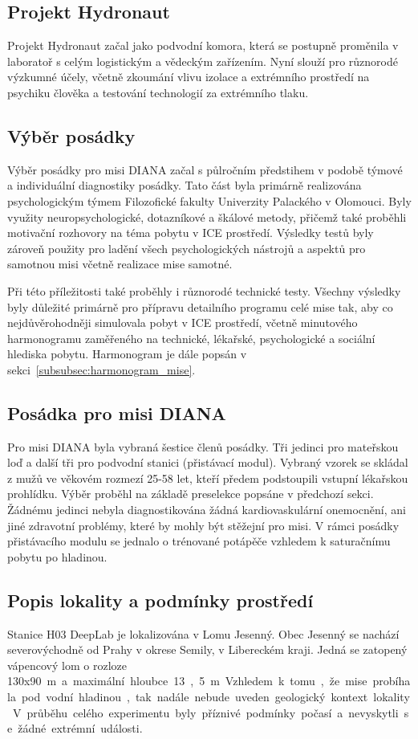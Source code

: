 \subsection{Projekt Hydronaut}
\label{subsec:projekt_hydronaut}
Projekt Hydronaut začal jako podvodní komora, která se postupně proměnila v
laboratoř s celým logistickým a vědeckým zařízením. Nyní slouží pro různorodé
výzkumné účely, včetně zkoumání vlivu izolace a extrémního prostředí na psychiku
člověka a testování technologií za extrémního tlaku.

\subsection{Výběr posádky}
\label{subsec:vyber_posadky}
Výběr posádky pro misi DIANA začal s půlročním předstihem v podobě týmové a
individuální diagnostiky posádky. Tato část byla primárně realizována
psychologickým týmem Filozofické fakulty Univerzity Palackého v Olomouci. Byly
využity neuropsychologické, dotazníkové a škálové metody, přičemž také proběhli
motivační rozhovory na téma pobytu v ICE prostředí. Výsledky testů byly zároveň
použity pro ladění všech psychologických nástrojů a aspektů pro samotnou misi
včetně realizace mise samotné.

Při této příležitosti také proběhly i různorodé technické testy. Všechny
výsledky byly důležité primárně pro přípravu detailního programu celé mise tak,
aby co nejdůvěrohodněji simulovala pobyt v ICE prostředí, včetně minutového
harmonogramu zaměřeného na technické, lékařské, psychologické a sociální
hlediska pobytu. Harmonogram je dále popsán v sekci~\ref{subsubsec:harmonogram_mise}.

\subsection{Posádka pro misi DIANA}
Pro misi DIANA byla vybraná šestice členů posádky. Tři jedinci pro mateřskou loď
a další tři pro podvodní stanici (přistávací modul). Vybraný vzorek se skládal z
mužů ve věkovém rozmezí 25-58 let, kteří předem podstoupili vstupní lékařskou
prohlídku. Výběr proběhl na základě preselekce popsáne v předchozí sekci.
Žádnému jedinci nebyla diagnostikována žádná kardiovaskulární onemocnění, ani
jiné zdravotní problémy, které by mohly být stěžejní pro misi. V rámci posádky
přistávacího modulu se jednalo o trénované potápěče vzhledem k saturačnímu
pobytu po hladinou.

\subsection{Popis lokality a podmínky prostředí}
\label{subsec:diana_lokalita}
Stanice H03 DeepLab je lokalizována v Lomu Jesenný. Obec Jesenný se nachází
severovýchodně od Prahy v okrese Semily, v Libereckém kraji. Jedná se zatopený
vápencový lom o rozloze 130x90~\si\meter~a maximální hloubce 13,5~\si\meter.
Vzhledem k tomu, že mise probíhala pod vodní hladinou, tak nadále nebude uveden
geologický kontext lokality. V průběhu celého experimentu byly příznivé podmínky
počasí a nevyskytli se žádné extrémní události.


